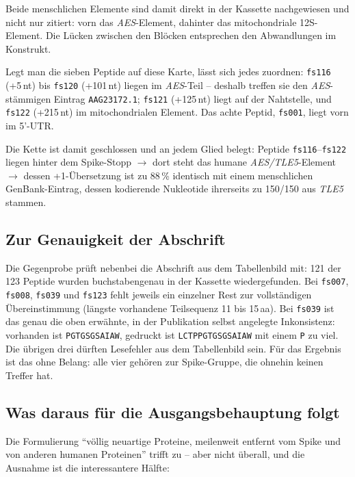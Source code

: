 \documentclass[11pt,a4paper]{article}
\begin{document}
Beide menschlichen Elemente sind damit direkt in der Kassette nachgewiesen und
nicht nur zitiert: vorn das \emph{AES}-Element, dahinter das mitochondriale
12S-Element. Die Lücken zwischen den Blöcken entsprechen den Abwandlungen im
Konstrukt.

Legt man die sieben Peptide auf diese Karte, lässt sich jedes zuordnen:
\texttt{fs116} (+5\,nt) bis \texttt{fs120} (+101\,nt) liegen im
\emph{AES}-Teil -- deshalb treffen sie den \emph{AES}-stämmigen Eintrag
\texttt{AAG23172.1}; \texttt{fs121} (+125\,nt) liegt auf der Nahtstelle, und
\texttt{fs122} (+215\,nt) im mitochondrialen Element. Das achte Peptid,
\texttt{fs001}, liegt vorn im 5'-UTR.

Die Kette ist damit geschlossen und an jedem Glied belegt: Peptide
\texttt{fs116}--\texttt{fs122} liegen hinter dem Spike-Stopp $\rightarrow$ dort
steht das humane \emph{AES/TLE5}-Element $\rightarrow$ dessen +1-Übersetzung
ist zu 88\,\% identisch mit einem menschlichen GenBank-Eintrag, dessen
kodierende Nukleotide ihrerseits zu 150/150 aus \emph{TLE5} stammen.

\subsection*{Zur Genauigkeit der Abschrift}

Die Gegenprobe prüft nebenbei die Abschrift aus dem Tabellenbild mit: 121 der
123 Peptide wurden buchstabengenau in der Kassette wiedergefunden. Bei
\texttt{fs007}, \texttt{fs008}, \texttt{fs039} und \texttt{fs123} fehlt jeweils
ein einzelner Rest zur vollständigen Übereinstimmung (längste vorhandene
Teilsequenz 11 bis 15\,aa). Bei \texttt{fs039} ist das genau die oben
erwähnte, in der Publikation selbst angelegte Inkonsistenz: vorhanden ist
\texttt{PGTGSGSAIAW}, gedruckt ist \texttt{LCTPPGTGSGSAIAW} mit einem
\texttt{P} zu viel. Die übrigen drei dürften Lesefehler aus dem Tabellenbild
sein. Für das Ergebnis ist das ohne Belang: alle vier gehören zur
Spike-Gruppe, die ohnehin keinen Treffer hat.

\subsection{Was daraus für die Ausgangsbehauptung folgt}

Die Formulierung ``völlig neuartige Proteine, meilenweit entfernt vom Spike und
von anderen humanen Proteinen'' trifft zu -- aber nicht überall, und die
Ausnahme ist die interessantere Hälfte:
\end{document}
